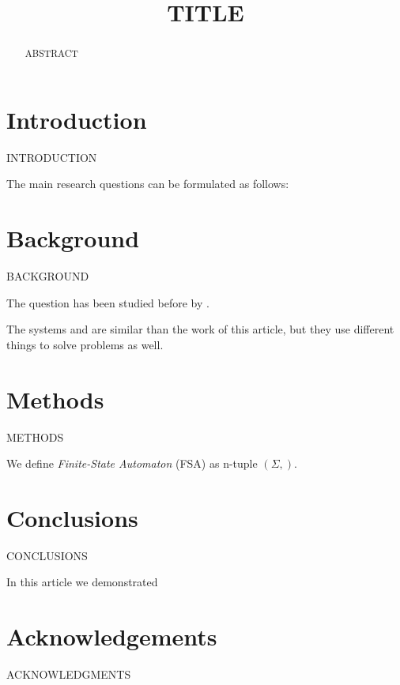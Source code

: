 \documentclass[free]{flammie}
\newif\ifcameraready
\begin{document}
\title{TITLE }


\ifcameraready
\author{AUTHOR \\
    \url{EMAIL} \\
    AFFILIATION \\
}
\fi

\maketitle
\begin{abstract}

    ABSTRACT
\end{abstract}

\section{Introduction}\label{sec:introduction}

INTRODUCTION

The main research questions can be formulated as follows:

\section{Background}\label{sec:background}

BACKGROUND

The question has been studied before by \cite{}.

The systems \cite{} and \cite{} are similar than the work of this article, but
they use different things to solve problems as well.

\section{Methods}\label{sec:methods}

METHODS

We define \textit{Finite-State Automaton} (FSA) as n-tuple $(\Sigma, )$.

\section{Conclusions}\label{sec:conclusions}

CONCLUSIONS

In this article we demonstrated

\section*{Acknowledgements}

ACKNOWLEDGMENTS



\end{document}

